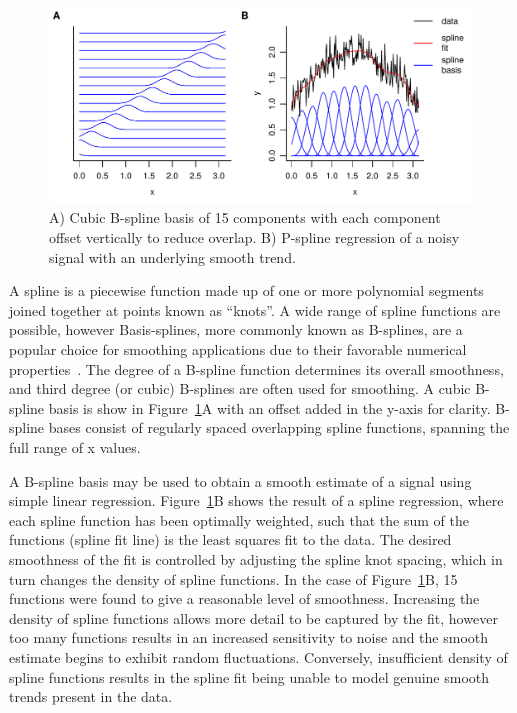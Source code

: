\documentclass[num-refs]{wiley-article}
\begin{document}
\begin{figure}
  \begin{center}
    \includegraphics[width=1\textwidth]{fig1.pdf}
    \caption{A) Cubic B-spline basis of 15 components with each component offset vertically to reduce overlap. B) P-spline regression of a noisy signal with an underlying smooth trend.}
    \label{bspline_regression}
  \end{center}
\end{figure}

A spline is a piecewise function made up of one or more polynomial segments joined together at points known as ``knots''. A wide range of spline functions are possible, however Basis-splines, more commonly known as B-splines, are a popular choice for smoothing applications due to their favorable numerical properties~\cite{DeBoor2001}. The degree of a B-spline function determines its overall smoothness, and third degree (or cubic) B-splines are often used for smoothing. A cubic B-spline basis is show in Figure~\ref{bspline_regression}A with an offset added in the y-axis for clarity. B-spline bases consist of regularly spaced overlapping spline functions, spanning the full range of x values.

A B-spline basis may be used to obtain a smooth estimate of a signal using simple linear regression. Figure~\ref{bspline_regression}B shows the result of a spline regression, where each spline function has been optimally weighted, such that the sum of the functions (spline fit line) is the least squares fit to the data. The desired smoothness of the fit is controlled by adjusting the spline knot spacing, which in turn changes the density of spline functions. In the case of Figure~\ref{bspline_regression}B, 15 functions were found to give a reasonable level of smoothness. Increasing the density of spline functions allows more detail to be captured by the fit, however too many functions results in an increased sensitivity to noise and the smooth estimate begins to exhibit random fluctuations. Conversely, insufficient density of spline functions results in the spline fit being unable to model genuine smooth trends present in the data.
\end{document}
